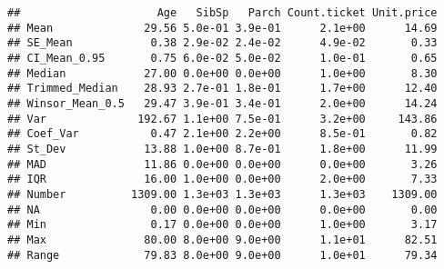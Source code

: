 \documentclass[
]{article}
\begin{document}
\begin{verbatim}
##                     Age   SibSp   Parch Count.ticket Unit.price
## Mean              29.56 5.0e-01 3.9e-01      2.1e+00      14.69
## SE_Mean            0.38 2.9e-02 2.4e-02      4.9e-02       0.33
## CI_Mean_0.95       0.75 6.0e-02 5.0e-02      1.0e-01       0.65
## Median            27.00 0.0e+00 0.0e+00      1.0e+00       8.30
## Trimmed_Median    28.93 2.7e-01 1.8e-01      1.7e+00      12.40
## Winsor_Mean_0.5   29.47 3.9e-01 3.4e-01      2.0e+00      14.24
## Var              192.67 1.1e+00 7.5e-01      3.2e+00     143.86
## Coef_Var           0.47 2.1e+00 2.2e+00      8.5e-01       0.82
## St_Dev            13.88 1.0e+00 8.7e-01      1.8e+00      11.99
## MAD               11.86 0.0e+00 0.0e+00      0.0e+00       3.26
## IQR               16.00 1.0e+00 0.0e+00      2.0e+00       7.33
## Number          1309.00 1.3e+03 1.3e+03      1.3e+03    1309.00
## NA                 0.00 0.0e+00 0.0e+00      0.0e+00       0.00
## Min                0.17 0.0e+00 0.0e+00      1.0e+00       3.17
## Max               80.00 8.0e+00 9.0e+00      1.1e+01      82.51
## Range             79.83 8.0e+00 9.0e+00      1.0e+01      79.34
\end{verbatim}
\end{document}
